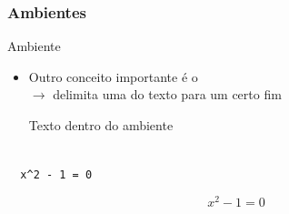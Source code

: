 \begin{frame}
\frametitle{Ambientes}


  \begin{block}{Ambiente}\medskip

    \begin{itemize}
    \item Outro conceito importante é o \\
      $\to$ delimita uma  do texto para um certo
      fim\medskip

      \texttt{\purple{\string\begin}}

        \quad Texto dentro do ambiente

        \texttt{\purple{\string\end}}
      \medskip
    \end{itemize}


  \end{block}


\medskip


\begin{exemplos}
  
  \begin{minipage}[t]{3cm}
    \texttt{\\
        \mbox{}\ \ x\textasciicircum{}2\ -\ 1\ =\ 0\\
        \purple{\string\end}}
  \end{minipage}
  \hfill
    \begin{minipage}[t]{6.5cm}
      \begin{equation}
        x^2-1=0       
      \end{equation}
    \end{minipage}
  \end{exemplos}

\end{frame}

